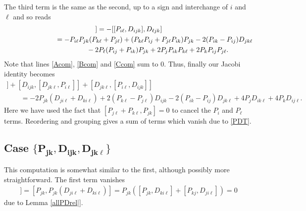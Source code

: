 \documentclass[10pt,a4paper]{amsart}
\numberwithin{equation}{section}
\begin{document}
The third term is the same as the second, up to a sign and interchange of $i$ and $\ell$ and so reads
\begin{gather}
[ D_{jk\ell}, [ P_{i\ell}, D_{ijk}]]= - [[ P_{i\ell}, D_{ijk}], D_{\ell jk}] \nonumber\\
\hphantom{[ D_{jk\ell}, [ P_{i\ell}, D_{ijk}]]}{}
=  -P_{i \ell}P_{jk}(P_{k\ell}+P_{j\ell}) +(P_{k\ell} P_{ij}+P_{j\ell}P_{ik}) P_{jk}-2(P_{ik}-P_{ij})D_{jk\ell}\nonumber\\
\hphantom{[ D_{jk\ell}, [ P_{i\ell}, D_{ijk}]]=}{}- 2P_{\ell}(P_{ij}+P_{ik}) P_{jk} +2P_{j}P_{ik}P_{k\ell}+2P_k P_{i j} P_{j\ell}.\label{Ccom}
 \end{gather}
 Note that lines \eqref{Acom}, \eqref{Bcom} and \eqref{Ccom} sum to 0.
 Thus, finally our Jacobi identity becomes
 \begin{gather*}
  [ P_{i \ell}, [ D_{ ijk}, D_{jkl}]] +[ D_{ ijk}, [D_{jk\ell}, P_{i \ell}]] + [ D_{jk\ell}, [ P_{i\ell}, D_{ijk}]]\\
 \qquad = -2P_{jk}(D_{j i \ell} + D_{k i \ell})+2(P_{k \ell}-P_{j \ell})D_{ijk} -2(P_{ik}-P_{ij})D_{jk\ell}
 + 4P_j D_{ik\ell}+4P_k D_{ij\ell}.
 \end{gather*}
 Here we have used the fact that $[ P_{j\ell} +P_{k \ell}, P_{jk}]=0$ to cancel the $P_i$ and $P_{\ell}$ terms. Reordering and grouping gives a sum of terms which vanish due to \eqref{PDT}.

\subsection[Case \{ P\_jk, D\_ ijk, D\_ jkl\}]{Case $\boldsymbol{\{ P_{jk}, D_{ ijk}, D_{ jk\ell}\}}$}
This computation is somewhat similar to the first, although possibly more straightforward.
The first term vanishes
\begin{gather*}
 [ P_{jk}, [ D_{ ijk}, D_{jkl}]] = [P_{jk}, P_{jk}(D_{ji\ell} +D_{ki\ell}) ]
 = P_{jk}( [P_{jk},D_{k i\ell} ]+ [P_{kj}, D_{ji\ell}])=0
 \end{gather*}
due to Lemma \ref{allPDrel|}.
\end{document}
